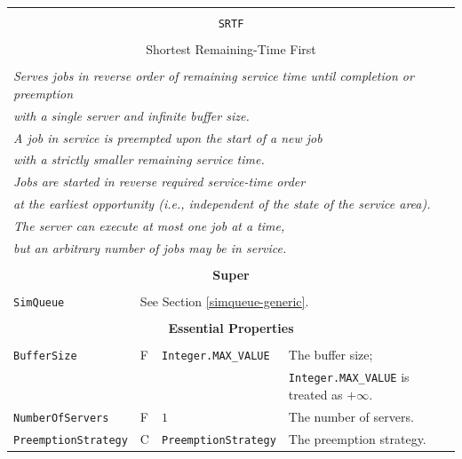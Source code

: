 \documentclass[12pt]{book}
\begin{document}
\begin{tabular}{|l|l|l|l|}
\hline
\multicolumn{4}{|c|}{} \\
\multicolumn{4}{|c|}{\lstinline[basicstyle=\large]{SRTF}} \\
\multicolumn{4}{|c|}{} \\
\multicolumn{4}{|c|}{Shortest Remaining-Time First} \\
\multicolumn{4}{|c|}{} \\
\hline
\multicolumn{4}{|l|}{\em Serves jobs in reverse order of remaining service time until completion or preemption} \\
\multicolumn{4}{|l|}{\em with a single server and infinite buffer size.} \\
\multicolumn{4}{|l|}{\em A job in service is preempted upon the start of a new job} \\
\multicolumn{4}{|l|}{\em with a strictly smaller remaining service time.} \\
\multicolumn{4}{|l|}{\em Jobs are started in reverse required service-time order} \\
\multicolumn{4}{|l|}{\em at the earliest opportunity (i.e., independent of the state of the service area).} \\
\multicolumn{4}{|l|}{\em The server can execute at most one job at a time,} \\
\multicolumn{4}{|l|}{\em but an arbitrary number of jobs may be in service.} \\
\hline
\multicolumn{4}{|c|}{} \\
\multicolumn{4}{|c|}{\bf Super} \\
\multicolumn{4}{|c|}{} \\
\hline
\lstinline|SimQueue| & \multicolumn{3}{|l|}{See Section \ref{simqueue-generic}.} \\
\hline
\multicolumn{4}{|c|}{} \\
\multicolumn{4}{|c|}{\bf Essential Properties} \\
\multicolumn{4}{|c|}{} \\
\hline
\lstinline|BufferSize|      & F & \lstinline|Integer.MAX_VALUE|
                            & The buffer size; \\
                        & & & \lstinline|Integer.MAX_VALUE| is treated as $+\infty$. \\
\hline
\lstinline|NumberOfServers|    & F & $1$
                               & The number of servers. \\
\hline
\lstinline|PreemptionStrategy| & C & \lstinline|PreemptionStrategy| & The preemption strategy. \\

\end{tabular}
\end{document}
